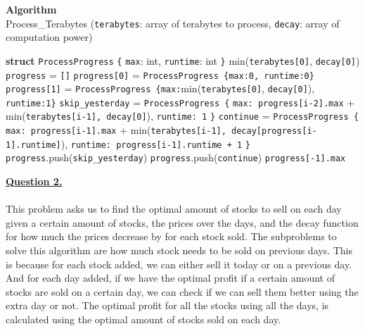 \documentclass[12pt]{article}
\begin{document}
\begin{algorithm}
  \caption*{\textbf{Algorithm}\\Process\_Terabytes \big(\texttt{terabytes}: array of terabytes to process, \texttt{decay}: array of computation power\big)}\label{alg:cap}
	\begin{algorithmic}[1]
    \State \textbf{struct} \texttt{ProcessProgress} \texttt{\{} \Indent
      \State \texttt{max}: int,
      \State \texttt{runtime}: int
    \EndIndent \State \texttt{\}}
    \State
      \State {}
    \EndIf
      \State \Return min(\texttt{terabytes[0]}, \texttt{decay[0]})
    \EndIf
    \State
    \State \texttt{progress} = \texttt{[]}
    \State \texttt{progress[0]} = \texttt{ProcessProgress \{max:0, runtime:0\}}
  \State \texttt{progress[1]} = \texttt{ProcessProgress \{max:}min(\texttt{terabytes[0]}, \texttt{decay[0]}), \texttt{runtime:1\}}
  \State
    \State \texttt{skip\_yesterday} = \texttt{ProcessProgress \{}\Indent
      \State \texttt{max: progress[i-2].max} + min(\texttt{terabytes[i-1], decay[0]}),
      \State \texttt{runtime: 1}
    \EndIndent \State \texttt{\}}
    \State \texttt{continue} = \texttt{ProcessProgress \{}\Indent
      \State \texttt{max: progress[i-1].max} + min(\texttt{terabytes[i-1], decay[progress[i-1].runtime]}),
      \State \texttt{runtime: progress[i-1].runtime + 1}
    \EndIndent \State \texttt{\}}
    \State
      \State \texttt{progress}.push(\texttt{skip\_yesterday})
    \Else
      \State \texttt{progress}.push(\texttt{continue})
    \EndIf
  \EndFor
  \State
  \State \Return \texttt{progress[-1].max}
	\end{algorithmic}
\end{algorithm}
\newpage
\hyperlink{toc}{\hypertarget{2}{\LARGE \underline{\textbf{Question 2.}}}}\\\\
This problem asks us to find the optimal amount of stocks to sell on each day given a certain amount of stocks,
the prices over the days, and the decay function for how much the prices decrease by for each stock sold.
The subproblems to solve this algorithm are how much stock needs to be sold on previous days. This is because for each stock added,
we can either sell it today or on a previous day. And for each day added, if we have the optimal profit if a certain amount of
stocks are sold on a certain day, we can check if we can sell them better using the extra day or not. The optimal profit for
all the stocks using all the days, is calculated using the optimal amount of stocks sold on each day.
\end{document}
